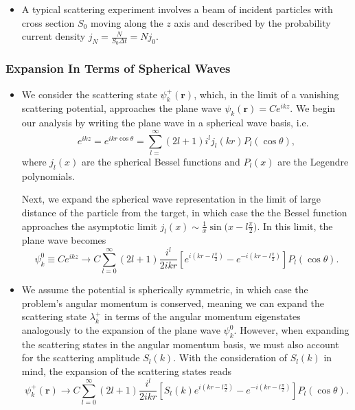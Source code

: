 \documentclass[11pt, a4paper]{article}
\renewcommand{\vec}[1]{\bm{#1}}  %
\renewcommand{\r}{\vec{r}}  %
\begin{document}
\begin{itemize}
    \item A typical scattering experiment involves a beam of incident particles with cross section $ S_{0} $ moving along the $ z $ axis and described by the probability current density $ j_{N} = \frac{N}{S_{0} \Delta t} = N j_{0} $.
    
\end{itemize}

\subsubsection{Expansion In Terms of Spherical Waves}

\begin{itemize}
    \item We consider the scattering state $ \psi_{k}^{+}(\r) $, which, in the limit of a vanishing scattering potential, approaches the plane wave $ \psi_{k}(\r) = Ce^{i k z} $. We begin our analysis by writing the plane wave in a spherical wave basis, i.e. 
    \begin{equation*}
        e^{ikz} = e^{ikr \cos \theta} = \sum_{l = }^{\infty} (2l + 1)i^{l}j_{l}(kr)P_{l}(\cos \theta),
    \end{equation*}
    where $ j_{l}(x) $ are the spherical Bessel functions and $ P_{l}(x) $ are the Legendre polynomials. 

    Next, we expand the spherical wave representation in the limit of large distance of the particle from the target, in which case the the Bessel function approaches the asymptotic limit $ j_{l}(x) \sim \frac{1}{x} \sin \big( x - l \frac{\pi}{2} \big) $. In this limit, the plane wave becomes
    \begin{equation*}
        \psi_{k}^{0} \equiv Ce^{ikz} \to C \sum_{l = 0}^{\infty} (2l + 1)\frac{i^{l}}{2ikr}\left[ e^{i(kr - l \frac{\pi}{2})} - e^{-i(kr - l \frac{\pi}{2})} \right]P_{l}(\cos \theta).
    \end{equation*}
    
    \item We assume the potential is spherically symmetric, in which case the problem's angular momentum is conserved, meaning we can expand the scattering state $ \lambda_{k}^{+} $ in terms of the angular momentum eigenstates analogously to the expansion of the plane wave $ \psi_{k}^{0} $. However, when expanding the scattering states in the angular momentum basis, we must also account for the scattering amplitude $ S_{l}(k) $. With the consideration of $ S_{l}(k) $ in mind, the expansion of the scattering states reads
    \begin{equation*}
        \psi_{k}^{+}(\r) \to C \sum_{l = 0}^{\infty} (2l + 1)\frac{i^{l}}{2ikr}\left[ S_{l}(k)e^{i(kr - l \frac{\pi}{2})} - e^{-i(kr - l \frac{\pi}{2})} \right]P_{l}(\cos \theta).
    \end{equation*}
    

\end{itemize}
\end{document}
